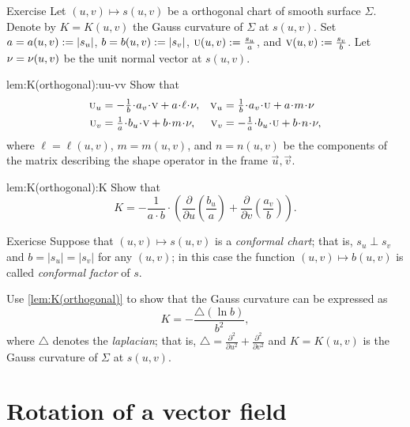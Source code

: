 \begin{thm}{Exercise}\label{lem:K(orthogonal)}
Let $(u,v)\mapsto s(u,v)$ be a orthogonal chart of smooth surface $\Sigma$.
Denote by $K=K(u,v)$ the Gauss curvature of $\Sigma$ at $s(u,v)$.
Set $a=a(u,v):=|s_u|$,
$b=b(u,v):=|s_v|$,
$\text{\sc{u}}(u,v):=\tfrac{s_u}a$,
and 
$\text{\sc{v}}(u,v):=\tfrac{s_v}b$.
Let $\nu=\nu(u,v)$ be the unit normal vector at $s(u,v)$.

\begin{subthm}{lem:K(orthogonal):uu-vv}
Show that 
\[
\begin{aligned}
\vec u_u
&=
-\tfrac1{b}\cdot a_v
\cdot
\vec v 
+
a\cdot \ell\cdot \Norm
,
&
\vec v_u
&=
\tfrac1{b}\cdot a_v
\cdot \vec u
+
a\cdot m\cdot \Norm
\\
\vec u_v
&=
\tfrac1{a}\cdot b_u\cdot\vec v
+
b\cdot m\cdot \Norm
,
&
\vec v_v
&=
-\tfrac1{a}\cdot b_u\cdot\vec u
+
b\cdot n\cdot \Norm,
\end{aligned}
\]
where $\ell=\ell(u,v)$, $m=m(u,v)$, and $n=n(u,v)$ be the components of the matrix describing the shape operator in the frame $\vec u, \vec v$.
\end{subthm}

\begin{subthm}{lem:K(orthogonal):K}
Show that
\[K=-\frac1{a\cdot b}\cdot
\left(
\frac{\partial}{\partial u}
\left(\frac{b_u}a \right)
+
\frac{\partial}{\partial v}
\left(\frac{a_v}b\right)
\right).\]
\end{subthm}
\end{thm}


\begin{thm}{Exericse}\label{ex:conformal}
Suppose that $(u,v)\mapsto s(u,v)$ is a \emph{conformal chart};
that is, $s_u\perp s_v$ and $b=|s_u|=|s_v|$ for any $(u,v)$;
in this case the function $(u,v)\mapsto b(u,v)$ is called \emph{conformal factor} of $s$.

Use \ref{lem:K(orthogonal)} to show that the Gauss curvature can be expressed as 
\[K=-\frac{\triangle (\ln b)}{b^2},\]
where $\triangle$ denotes the \emph{laplacian}; that is, $\triangle=\tfrac{\partial^2}{\partial u^2}+\tfrac{\partial^2}{\partial v^2}$ and 
 $K=K(u,v)$ is the Gauss curvature of $\Sigma$ at $s(u,v)$.
\end{thm}

\section{Rotation of a vector field}

